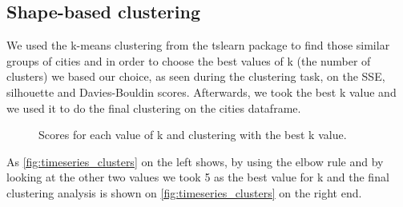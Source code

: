 \subsection{Shape-based clustering}
We used the k-means clustering from the tslearn package to find those similar groups of cities and in order to choose the best values of k (the number of clusters) we based our choice, as seen during the clustering task, on the SSE, silhouette and Davies-Bouldin scores. Afterwards, we took the best k value and we used it to do the final clustering on the cities dataframe.
\begin{figure}[H]
    \centering
    \caption{Scores for each value of k and clustering with the best k value.}
    \label{fig:timeseries_clusters}
\end{figure}
As \autoref{fig:timeseries_clusters} on the left shows, by using the elbow rule and by looking at the other two values we took 5 as the best value for k and the final clustering analysis is shown on \autoref{fig:timeseries_clusters} on the right end.
\vspace{3mm}

